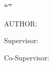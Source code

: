 \begin{center}
    \textbf{{\LARGE {}``\thesisTitle''}}\\
\end{center}

\vspace*{15mm}


\begin{center}
    AUTHOR:
    \par
    \textbf{{\large \thesisAuthor}}
\end{center}


\begin{center}
    \vspace*{1mm}
    Supervisor:
    \par
    \textbf{{\large \thesisProf}}
\end{center}
\begin{center}
    Co-Supervisor:
    \par
    \textbf{{\large \thesisTutor}}
\end{center}

\begin{center}
    \vspace*{1mm}
    {\large \thesisDepartment}
\end{center}

\newpage
\thispagestyle{empty}
\restoregeometry
